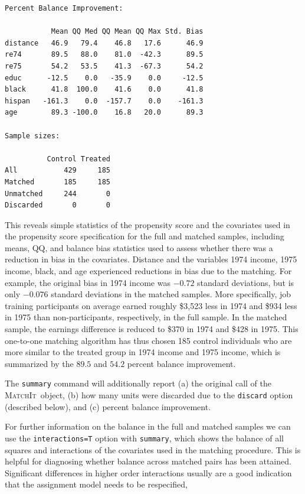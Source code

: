 \documentclass[oneside,letterpaper,titlepage]{article}
\newcommand{\MatchIt}{\textsc{MatchIt}}
\begin{document}
\begin{enumerate}
\begin{verbatim}
Percent Balance Improvement:

           Mean QQ Med QQ Mean QQ Max Std. Bias
distance   46.9   79.4    46.8   17.6      46.9
re74       89.5   88.0    81.0  -42.3      89.5
re75       54.2   53.5    41.3  -67.3      54.2
educ      -12.5    0.0   -35.9    0.0     -12.5
black      41.8  100.0    41.6    0.0      41.8
hispan   -161.3    0.0  -157.7    0.0    -161.3
age        89.3 -100.0    16.8   20.0      89.3

Sample sizes:

          Control Treated
All           429     185
Matched       185     185
Unmatched     244       0
Discarded       0       0
\end{verbatim}
This reveals simple statistics of the propensity score and the
covariates used in the propensity score specification for the full and
matched samples, including means, QQ, and balance bias statistics used
to assess whether there was a reduction in bias in the covariates.
Distance and the variables 1974 income, 1975 income, black, and age
experienced reductions in bias due to the matching.  For example, the
original bias in 1974 income was $-0.72$ standard deviations, but is
only $-0.076$ standard deviations in the matched samples.  More
specifically, job training participants on average earned roughly
\$3,523 less in 1974 and \$934 less in 1975 than non-participants,
respectively, in the full sample.  In the matched sample, the earnings
difference is reduced to \$370 in 1974 and \$428 in 1975.  This
one-to-one matching algorithm has thus chosen 185 control individuals
who are more similar to the treated group in 1974 income and 1975
income, which is summarized by the $89.5$ and $54.2$ percent
balance improvement. 

The \texttt{summary} command will additionally report (a) the original
call of the \MatchIt\ object, (b) how many units were discarded due
to the \texttt{discard} option (described below), and (c) percent
balance improvement.  

For further information on the balance in the full and matched samples
we can use the {\tt interactions=T} option with {\tt summary}, which
shows the balance of all squares and interactions of the covariates
used in the matching procedure.  This is helpful for diagnosing
whether balance across matched pairs has been attained.  Significant
differences in higher order interactions usually are a good indication
that the assignment model needs to be respecified, %


\end{enumerate}
\end{document}
